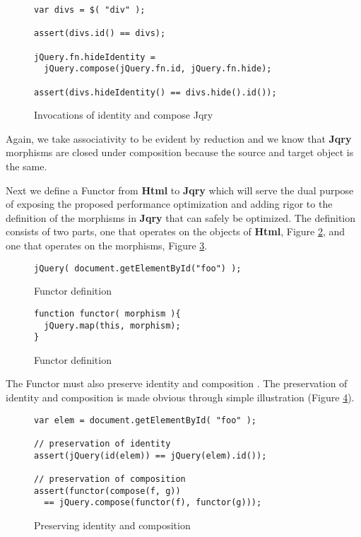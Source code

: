 \documentclass[preprint]{sigplanconf}
\begin{document}
\begin{figure}[!ht]
\small
\begin{verbatim}
var divs = $( "div" );

assert(divs.id() == divs);

jQuery.fn.hideIdentity =
  jQuery.compose(jQuery.fn.id, jQuery.fn.hide);

assert(divs.hideIdentity() == divs.hide().id());
\end{verbatim}
\nocaptionrule \caption{Invocations of identity and compose Jqry}
\label{fig:sample-jqry-compose}
\end{figure}

Again, we take associativity to be evident by reduction and we know that \textbf{Jqry} morphisms are closed under composition because the source and target object is the same.

Next we define a Functor from \textbf{Html} to \textbf{Jqry} which will serve the dual purpose of exposing the proposed performance optimization and adding rigor to the definition of the morphisms in \textbf{Jqry} that can safely be optimized. The definition consists of two parts, one that operates on the objects of \textbf{Html}, Figure \ref{fig:functor-for-object}, and one that operates on the morphisms, Figure \ref{fig:functor-for-morphism}.

\begin{figure}[!ht]
\small
\begin{verbatim}
jQuery( document.getElementById("foo") );
\end{verbatim}
\nocaptionrule \caption{Functor definition}
\label{fig:functor-for-object}
\end{figure}

\begin{figure}[!ht]
\small
\begin{verbatim}
function functor( morphism ){
  jQuery.map(this, morphism);
}
\end{verbatim}
\nocaptionrule \caption{Functor definition}
\label{fig:functor-for-morphism}
\end{figure}

The Functor must also preserve identity and composition \cite[p. ~36]{bib:category-definition}. The preservation of identity and composition is made obvious through simple illustration (Figure \ref{fig:id-and-compose}).

\begin{figure}[!ht]
\small
\begin{verbatim}
var elem = document.getElementById( "foo" );

// preservation of identity
assert(jQuery(id(elem)) == jQuery(elem).id());

// preservation of composition
assert(functor(compose(f, g))
  == jQuery.compose(functor(f), functor(g)));
\end{verbatim}
\nocaptionrule \caption{Preserving identity and composition}
\label{fig:id-and-compose}
\end{figure}
\end{document}
